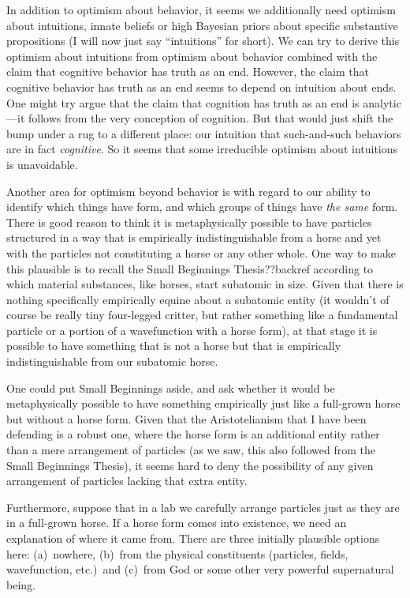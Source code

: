 In addition to optimism about behavior, it seems we additionally need optimism about intuitions, innate beliefs or 
high Bayesian priors about specific substantive propositions (I will now just say ``intuitions'' for short). We can try to derive 
this optimism about intuitions from optimism about behavior combined with the claim that cognitive behavior has truth as 
an end. However, the claim that cognitive behavior has truth as an end seems to depend on intuition about ends. One might 
try argue that the claim that cognition has truth as an end is analytic---it follows from the very conception of cognition.
But that would just shift the bump under a rug to a different place: our intuition that such-and-such behaviors are in fact
\textit{cognitive}. So it seems that some irreducible optimism about intuitions is unavoidable. 

Another area for optimism beyond behavior is with regard to our ability to identify which things have form, and which groups of
things have \textit{the same} form. There is good reason to think it is metaphysically possible to have particles structured in 
a way that is empirically indistinguishable from a horse and yet with the particles not constituting a horse or any other 
whole. One way to make this plausible is to recall the Small Beginnings Thesis??backref according to which material substances, 
like horses, start subatomic in size. Given that there is nothing specifically empirically equine about a subatomic entity
(it wouldn't of course be really tiny four-legged critter, but rather something like a fundamental particle or a portion of a 
wavefunction with a horse form), at that stage it is possible to have something that is not a horse but 
that is empirically indistinguishable from our subatomic horse. 

One could put Small Beginnings aside, and ask whether it would be metaphysically possible to have something empirically
just like a full-grown horse but without a horse form. Given that the Aristotelianism that I have been defending is a 
robust one, where the horse form is an additional entity rather than a mere arrangement of particles (as we saw, this also
followed from the Small Beginnings Thesis), it seems hard to deny the possibility of any given arrangement of particles lacking that
extra entity. 

Furthermore, suppose that in a lab we 
carefully arrange particles just as they are in a full-grown horse. If a horse form comes into existence, we need an explanation 
of where it came from. There are three initially plausible options here: (a)~nowhere, (b)~from the physical constituents (particles,
fields, wavefunction, etc.)\ and (c)~from God or some other very powerful supernatural being.

